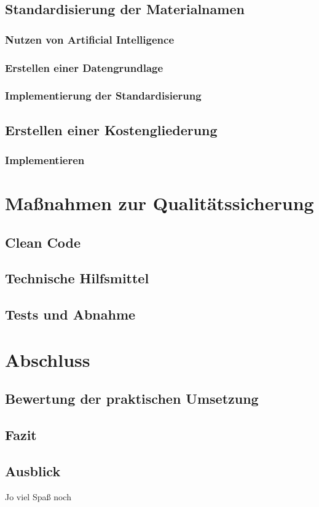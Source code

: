 \subsection{Standardisierung der Materialnamen}
\subsubsection{Nutzen von Artificial Intelligence}

\subsubsection{Erstellen einer Datengrundlage}
\subsubsection{Implementierung der Standardisierung}

\subsection{Erstellen einer Kostengliederung}
\subsubsection{Implementieren}

\section{Maßnahmen zur Qualitätssicherung}
\subsection{Clean Code}
\subsection{Technische Hilfsmittel}
\subsection{Tests und Abnahme}

\section{Abschluss}
\subsection{Bewertung der praktischen Umsetzung}
\subsection{Fazit}
\subsection{Ausblick}
 Jo viel Spaß noch
